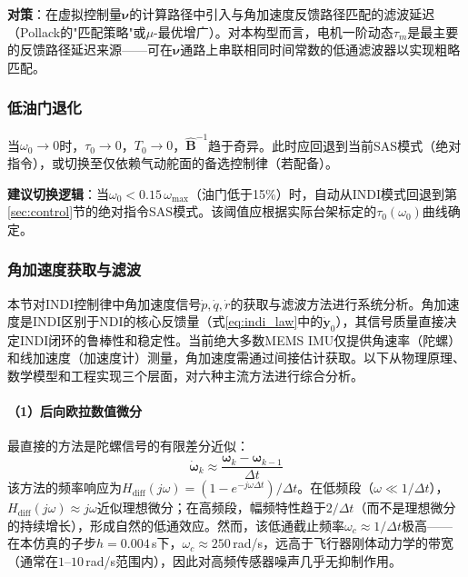 \textbf{对策}：在虚拟控制量$\boldsymbol{\nu}$的计算路径中引入与角加速度反馈路径匹配的滤波延迟（Pollack的"匹配策略"或$\mu$-最优增广\cite{pollack2023robust}）。对本构型而言，电机一阶动态$\tau_m$是最主要的反馈路径延迟来源——可在$\boldsymbol{\nu}$通路上串联相同时间常数的低通滤波器以实现粗略匹配。

\subsubsection{低油门退化}

当$\omega_0\to 0$时，$\tau_0\to 0$，$T_0\to 0$，$\hat{\mathbf{B}}^{-1}$趋于奇异。此时应回退到当前SAS模式（绝对指令），或切换至仅依赖气动舵面的备选控制律（若配备）。

\textbf{建议切换逻辑}：当$\omega_0 < 0.15\,\omega_{\max}$（油门低于15\%）时，自动从INDI模式回退到第\ref{sec:control}节的绝对指令SAS模式。该阈值应根据实际台架标定的$\tau_0(\omega_0)$曲线确定。

\subsubsection{角加速度获取与滤波}
\label{sec:accel_estimation}

本节对INDI控制律中角加速度信号$\dot{p},\dot{q},\dot{r}$的获取与滤波方法进行系统分析。角加速度是INDI区别于NDI的核心反馈量（式\ref{eq:indi_law}中的$\dot{\mathbf{y}}_0$），其信号质量直接决定INDI闭环的鲁棒性和稳定性。当前绝大多数MEMS IMU仅提供角速率（陀螺）和线加速度（加速度计）测量，角加速度需通过间接估计获取。以下从物理原理、数学模型和工程实现三个层面，对六种主流方法进行综合分析。

\paragraph{（1）后向欧拉数值微分}

最直接的方法是陀螺信号的有限差分近似：
\begin{equation}
    \dot{\boldsymbol{\omega}}_k \approx \frac{\boldsymbol{\omega}_k - \boldsymbol{\omega}_{k-1}}{\Delta t}
    \label{eq:bwd_euler}
\end{equation}
该方法的频率响应为$H_{\mathrm{diff}}(j\omega) = (1 - e^{-j\omega\Delta t})/\Delta t$。在低频段（$\omega \ll 1/\Delta t$），$H_{\mathrm{diff}}(j\omega) \approx j\omega$近似理想微分；在高频段，幅频特性趋于$2/\Delta t$（而不是理想微分的持续增长），形成自然的低通效应。然而，该低通截止频率$\omega_c \approx 1/\Delta t$极高——在本仿真的子步$h=0.004$\,s下，$\omega_c\approx 250$\,rad/s，远高于飞行器刚体动力学的带宽（通常在$1$--$10$\,rad/s范围内），因此对高频传感器噪声几乎无抑制作用。

